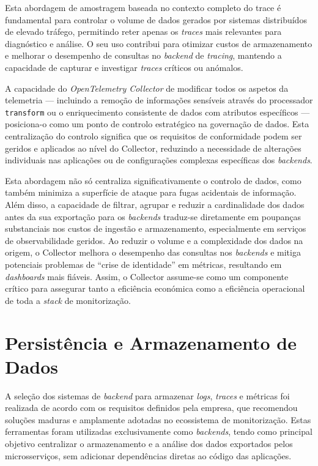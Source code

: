 \begin{itemize}
Esta abordagem de amostragem baseada no contexto completo do trace é fundamental para controlar o volume de dados gerados por sistemas distribuídos de elevado tráfego, permitindo reter apenas os \textit{traces} mais relevantes para diagnóstico e análise. O seu uso contribui para otimizar custos de armazenamento e melhorar o desempenho de consultas no \textit{backend} de \textit{tracing}, mantendo a capacidade de capturar e investigar \textit{traces} críticos ou anómalos.

\end{itemize}

A capacidade do \textit{OpenTelemetry Collector} de modificar todos os aspetos da telemetria --- incluindo a remoção de informações sensíveis através do processador \texttt{transform} ou o enriquecimento consistente de dados com atributos específicos --- posiciona-o como um ponto de controlo estratégico na governação de dados. Esta centralização do controlo significa que os requisitos de conformidade podem ser geridos e aplicados ao nível do Collector, reduzindo a necessidade de alterações individuais nas aplicações ou de configurações complexas específicas dos \textit{backends}.

Esta abordagem não só centraliza significativamente o controlo de dados, como também minimiza a superfície de ataque para fugas acidentais de informação. Além disso, a capacidade de filtrar, agrupar e reduzir a cardinalidade dos dados antes da sua exportação para os \textit{backends} traduz-se diretamente em poupanças substanciais nos custos de ingestão e armazenamento, especialmente em serviços de observabilidade geridos. Ao reduzir o volume e a complexidade dos dados na origem, o Collector melhora o desempenho das consultas nos \textit{backends} e mitiga potenciais problemas de ``crise de identidade'' em métricas, resultando em \textit{dashboards} mais fiáveis. Assim, o Collector assume-se como um componente crítico para assegurar tanto a eficiência económica como a eficiência operacional de toda a \textit{stack} de monitorização.



\section{Persistência e Armazenamento de Dados }

A seleção dos sistemas de \textit{backend} para armazenar \textit{logs}, \textit{traces} e métricas foi realizada de acordo com os requisitos definidos pela empresa, que recomendou soluções maduras e amplamente adotadas no ecossistema de monitorização. Estas ferramentas foram utilizadas exclusivamente como \textit{backends}, tendo como principal objetivo centralizar o armazenamento e a análise dos dados exportados pelos microsserviços, sem adicionar dependências diretas ao código das aplicações.

